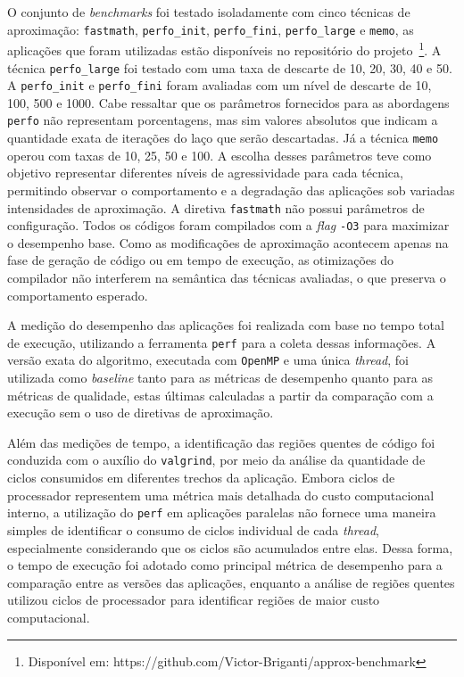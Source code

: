 O conjunto de \textit{benchmarks} foi testado isoladamente com cinco técnicas de aproximação: \texttt{fastmath}, \texttt{perfo\_init}, \texttt{perfo\_fini}, \texttt{perfo\_large} e \texttt{memo}, as aplicações que foram utilizadas estão disponíveis no repositório do projeto~\footnote{Disponível em: https://github.com/Victor-Briganti/approx-benchmark}. A técnica \texttt{perfo\_large} foi testado com uma taxa de descarte de 10, 20, 30, 40 e 50. A \texttt{perfo\_init} e \texttt{perfo\_fini} foram avaliadas com um nível de descarte de 10, 100, 500 e 1000. Cabe ressaltar que os parâmetros fornecidos para as abordagens \texttt{perfo} não representam porcentagens, mas sim valores absolutos que indicam a quantidade exata de iterações do laço que serão descartadas. Já a técnica \texttt{memo} operou com taxas de 10, 25, 50 e 100. A escolha desses parâmetros teve como objetivo representar diferentes níveis de agressividade para cada técnica, permitindo observar o comportamento e a degradação das aplicações sob variadas intensidades de aproximação. A diretiva \texttt{fastmath} não possui parâmetros de configuração. Todos os códigos foram compilados com a \textit{flag} \texttt{-O3} para maximizar o desempenho base. Como as modificações de aproximação acontecem apenas na fase de geração de código ou em tempo de execução, as otimizações do compilador não interferem na semântica das técnicas avaliadas, o que preserva o comportamento esperado.

A medição do desempenho das aplicações foi realizada com base no tempo total de execução, utilizando a ferramenta \texttt{perf} para a coleta dessas informações. A versão exata do algoritmo, executada com \texttt{OpenMP} e uma única \textit{thread}, foi utilizada como \textit{baseline} tanto para as métricas de desempenho quanto para as métricas de qualidade, estas últimas calculadas a partir da comparação com a execução sem o uso de diretivas de aproximação.

Além das medições de tempo, a identificação das regiões quentes de código foi conduzida com o auxílio do \texttt{valgrind}, por meio da análise da quantidade de ciclos consumidos em diferentes trechos da aplicação. Embora ciclos de processador representem uma métrica mais detalhada do custo computacional interno, a utilização do \texttt{perf} em aplicações paralelas não fornece uma maneira simples de identificar o consumo de ciclos individual de cada \textit{thread}, especialmente considerando que os ciclos são acumulados entre elas. Dessa forma, o tempo de execução foi adotado como principal métrica de desempenho para a comparação entre as versões das aplicações, enquanto a análise de regiões quentes utilizou ciclos de processador para identificar regiões de maior custo computacional.

